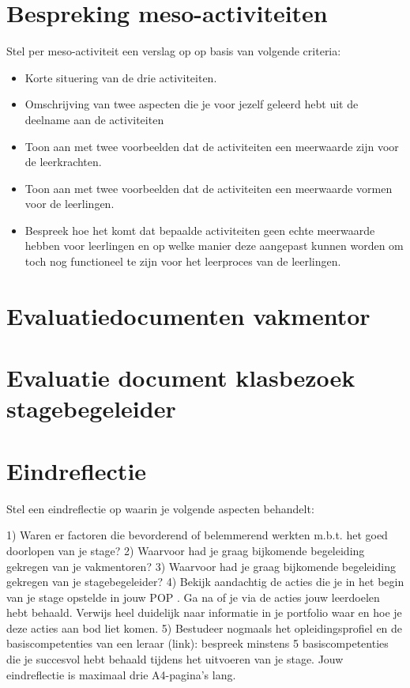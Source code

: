 \documentclass[a4paper,12pt,twoside]{article}%
\begin{document}








\section{Bespreking meso-activiteiten}
Stel per meso-activiteit een verslag op op basis van volgende criteria:
\begin{itemize}
	\item Korte situering van de drie activiteiten.
 	\item Omschrijving van twee aspecten die je voor jezelf geleerd hebt uit de deelname aan de activiteiten
	\item  Toon aan met twee voorbeelden dat de activiteiten een meerwaarde zijn voor de leerkrachten.
	\item Toon aan met twee voorbeelden dat de activiteiten een meerwaarde vormen voor de leerlingen.
	\item Bespreek hoe het komt dat bepaalde activiteiten geen echte meerwaarde hebben voor leerlingen en op welke manier deze aangepast kunnen worden om toch nog functioneel te zijn voor het leerproces van de leerlingen.
\end{itemize}


\section{Evaluatiedocumenten vakmentor}

\section{Evaluatie document klasbezoek stagebegeleider}

\section{Eindreflectie}
Stel een eindreflectie op waarin je volgende aspecten behandelt: 

1) Waren er factoren die bevorderend of belemmerend werkten m.b.t. het goed doorlopen van je stage? 
2) Waarvoor had je graag bijkomende begeleiding gekregen van je vakmentoren? 
3) Waarvoor had je graag bijkomende begeleiding gekregen van je stagebegeleider? 
4) Bekijk aandachtig de acties die je in het begin van je stage opstelde in jouw POP . Ga na of je via de acties jouw leerdoelen hebt behaald. Verwijs heel duidelijk naar informatie in je portfolio waar en hoe je deze acties aan bod liet komen. 
5)  Bestudeer nogmaals het opleidingsprofiel en de basiscompetenties van een leraar (link):  bespreek minstens 5 basiscompetenties die je succesvol hebt behaald tijdens het uitvoeren van je stage. 
Jouw eindreflectie is maximaal drie A4-pagina’s lang. 
\end{document}
